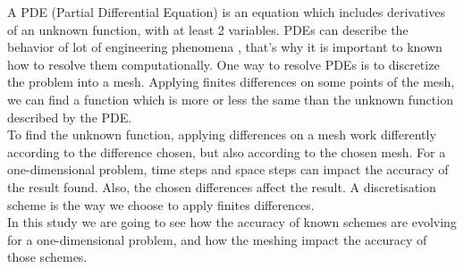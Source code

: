 \documentclass{article}
\begin{document}
    A PDE (Partial Differential Equation) is an equation which includes derivatives of an unknown function, with at least 2 variables.
    PDEs can describe the behavior of lot of engineering phenomena \cite{pde}, that's why it is important to 
    known how to resolve them computationally. One way to resolve PDEs is to discretize the problem into
    a mesh. Applying finites differences on some points of the mesh, we can find a function
    which is more or less the same than the unknown function described by the PDE.
    \\
    To find the unknown function, applying differences on a mesh work differently according to the difference chosen, 
    but also according to the chosen mesh. For a one-dimensional problem, time steps and space steps can impact the accuracy
    of the result found. Also, the chosen differences affect the result. A discretisation scheme is the way we choose to apply
    finites differences.
    \\
    In this study we are going to see how the accuracy of known schemes are evolving for a one-dimensional problem, and how the 
    meshing impact the accuracy of those schemes.
    
    


    \newpage
\end{document}
